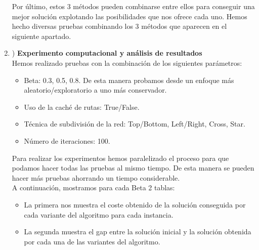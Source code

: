 \documentclass[11pt]{article} %
\begin{document}
\begin{enumerate}
Por último, estos 3 métodos pueden combinarse entre ellos para conseguir una mejor solución explotando las posibilidades que nos ofrece cada uno. Hemos hecho diversas pruebas combinando los 3 métodos que aparecen en el siguiente apartado.

\clearpage

   \item) \textbf{Experimento computacional y análisis de resultados}\\[0.2cm]

Hemos realizado pruebas con la combinación de los siguientes parámetros:
\begin{itemize}
\item Beta: 0.3, 0.5, 0.8. De esta manera probamos desde un enfoque más aleatorio/exploratorio a uno más conservador.
\item Uso de la caché de rutas: True/False.
\item Técnica de subdivisión de la red: Top/Bottom, Left/Right, Cross, Star. 
\item Número de iteraciones: 100.
\end{itemize}

Para realizar los experimentos hemos paralelizado el proceso para que podamos hacer todas las pruebas al mismo tiempo. De esta manera se pueden hacer más pruebas ahorrando un tiempo considerable.\\
A continuación, mostramos para cada Beta 2 tablas: 
\begin{itemize}
\item La primera nos muestra el coste obtenido de la solución conseguida por cada variante del algoritmo para cada instancia.
\item La segunda muestra el gap entre la solución inicial y la solución obtenida por cada una de las variantes del algoritmo.
\end{itemize}


\end{enumerate}
\end{document}
